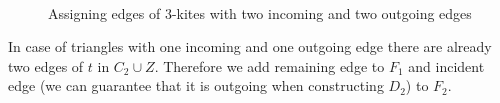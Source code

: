 \documentclass[a4, 11pt]{article}
\newcommand{\<}{\langle}
\renewcommand{\>}{\rangle}
\begin{document}
\begin{figure}[h!]
\begin{subfigure}[t]{0.47\textwidth}
\end{subfigure}
\\
\begin{subfigure}[t]{0.47\textwidth}
	\centering
\end{subfigure}
\quad
\begin{subfigure}[t]{0.47\textwidth}
	\centering
\end{subfigure}
	
	
	
	
	\caption{Assigning edges of $3$-kites with two incoming and two outgoing edges}
	\label{fig:triangles_2out2in}
\end{figure}

In case of triangles with one incoming and one outgoing edge there are already two edges of $t$ in $C_2 \cup Z$. Therefore we add remaining edge to $F_1$ and incident edge (we can guarantee that it is outgoing when constructing $D_2$) to $F_2$.
\end{document}
